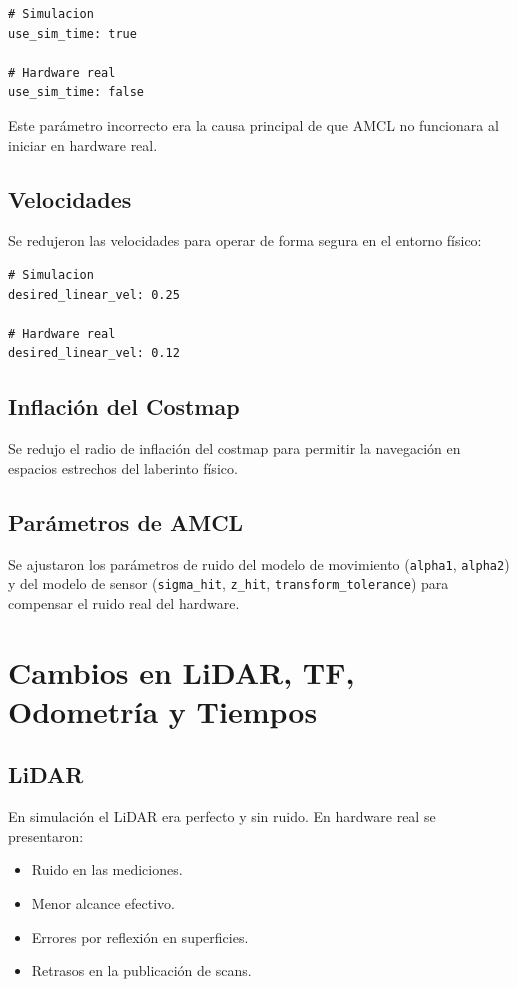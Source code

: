 \documentclass[conference]{IEEEtran}
\begin{document}
\begin{lstlisting}
# Simulacion
use_sim_time: true

# Hardware real
use_sim_time: false
\end{lstlisting}

Este parámetro incorrecto era la causa principal de que AMCL no funcionara al
iniciar en hardware real.

\subsection{Velocidades}
Se redujeron las velocidades para operar de forma segura en el entorno físico:

\begin{lstlisting}
# Simulacion
desired_linear_vel: 0.25

# Hardware real
desired_linear_vel: 0.12
\end{lstlisting}

\subsection{Inflación del Costmap}
Se redujo el radio de inflación del costmap para permitir la navegación en
espacios estrechos del laberinto físico.

\subsection{Parámetros de AMCL}
Se ajustaron los parámetros de ruido del modelo de movimiento
(\texttt{alpha1}, \texttt{alpha2}) y del modelo de sensor
(\texttt{sigma\_hit}, \texttt{z\_hit}, \texttt{transform\_tolerance}) para
compensar el ruido real del hardware.

\section{Cambios en LiDAR, TF, Odometría y Tiempos}

\subsection{LiDAR}
En simulación el LiDAR era perfecto y sin ruido. En hardware real se presentaron:

\begin{itemize}
  \item Ruido en las mediciones.
  \item Menor alcance efectivo.
  \item Errores por reflexión en superficies.
  \item Retrasos en la publicación de scans.
\end{itemize}
\end{document}
